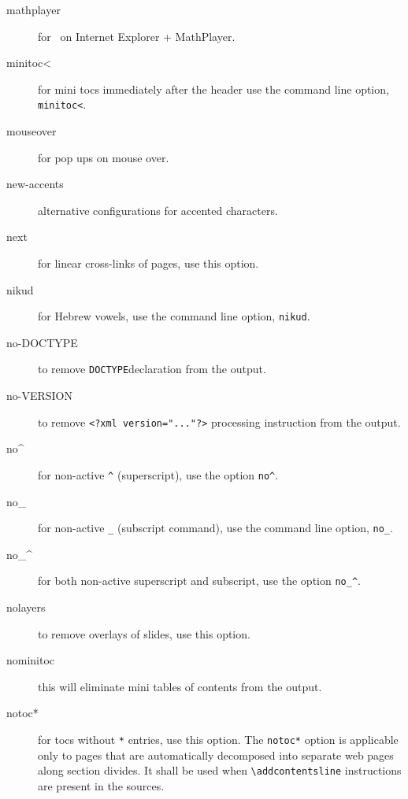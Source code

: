 \begin{description}
\item[mathplayer] for \mathml\ on Internet Explorer + MathPlayer.

\item[minitoc<] for mini tocs immediately after the header use the
  command line option, \verb=minitoc<=.

\item[mouseover] for pop ups on mouse over.

\item[new-accents] alternative configurations for accented characters. 

\item[next] for linear cross-links of pages, use this option.

\item[nikud] for Hebrew vowels, use the command line option,
  \verb=nikud=.

\item[no-DOCTYPE] to remove \texttt{DOCTYPE}\space declaration from
  the output.

\item[no-VERSION] to remove \verb+<?xml version="..."?>+ processing
  instruction from the output.


\item[no\textasciicircum] for non-active \verb=^= (superscript), use the option
  \verb=no^=.

\item[no\_] for non-active \verb=_= (subscript command), use the
  command line option, \verb=no_=.

\item[no\_\textasciicircum] for both non-active superscript and subscript, use the
  option \verb=no_^=.

\item[nolayers] to remove overlays of slides, use this option.

\item[nominitoc] this will eliminate mini tables of contents from the
  output.

\item[notoc*] for tocs without \verb=*= entries, use this option. The
  \verb=notoc*= option is applicable only to pages that are
  automatically decomposed into separate web pages along section
  divides. It shall be used when \verb=\addcontentsline= instructions
  are present in the sources.


\end{description}
